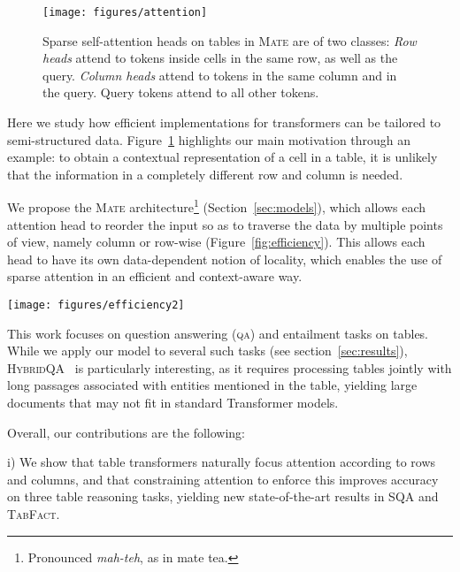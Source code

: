 \documentclass[11pt]{article}
\newcommand{\abr}[1]{\textsc{#1}}
\newcommand{\qa}[0]{\abr{qa}}
\newcommand\sqa{\textsc{SQA}\xspace}
\newcommand\tabfact{\textsc{TabFact}\xspace}
\newcommand\hqa{\textsc{HybridQA}\xspace}
\newcommand{\model}{\textsc{Mate}\xspace}
\begin{document}
\begin{figure}
    \centering
    \texttt{[image: figures/attention]}
    \caption{Sparse self-attention heads on tables in \model are of two classes: \emph{Row heads} attend to tokens inside cells in the same row, as well as the query. \emph{Column heads} attend to tokens in the same column and in the query. Query tokens attend to all other tokens.}
    \label{fig:attention}
\end{figure}

 

Here we study how efficient implementations for transformers can be tailored to semi-structured data.
Figure~\ref{fig:attention} highlights our main motivation through an example:
to obtain a contextual representation of a cell in a table, it is unlikely that the information in a completely different row and column is needed.

We propose the \model architecture\footnote{Pronounced \emph{mah-teh}, as in mate tea.} (Section~\ref{sec:models}), which allows each attention head to reorder the input so as to traverse the data by multiple points of view, namely column or row-wise (Figure~\ref{fig:efficiency}).
This allows each head to have its own data-dependent notion of locality, which enables the use of sparse attention in an efficient and context-aware way.

\begin{figure*}[ht]
    \centering
    \texttt{[image: figures/efficiency2]}
    \caption{Efficient implementation for \model. Each attention head reorders the tokens by either column or row index and then applies a windowed attention mechanism. This figure omits the global section that attends to and from all other tokens. Since column/row order can be pre-computed, the method is linear for a constant block size.}
    \label{fig:efficiency}
\end{figure*}

This work focuses on question answering (\qa) and entailment tasks on tables. While we apply our model to several such tasks (see section~\ref{sec:results}), \hqa~\cite{chen-etal-2020-hybridqa} is particularly interesting, as it requires processing tables jointly with long passages associated with entities mentioned
in the table, yielding large documents that may not fit in standard Transformer models.

Overall, our contributions are the following:

i) We show that table transformers naturally focus attention according to rows and columns, and that constraining attention to enforce this improves accuracy on three table reasoning tasks, yielding new state-of-the-art results in \sqa and \tabfact.
\end{document}
